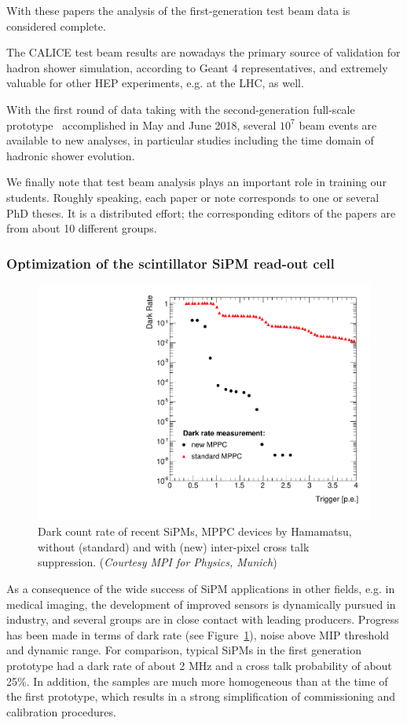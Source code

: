 With these papers the analysis of the first-generation test beam data is considered complete.

The CALICE test beam results are nowadays the primary source of validation for hadron shower simulation, according to Geant 4 representatives, and extremely valuable for other HEP experiments, e.g. at the LHC, as well.

With the first round of data taking with the second-generation full-scale prototype~\cite{Sefkow:2018rhp} accomplished in May and June 2018, several $10^7$ beam events are available to new analyses, in particular studies including the time domain of hadronic shower evolution.

We finally note that test beam analysis plays an important role in training our students. Roughly speaking, each paper or note corresponds to one or several PhD theses. It is a distributed effort; the corresponding editors of the papers are from about 10 different groups.

\subsubsection{Optimization of the scintillator SiPM read-out cell}
\label{sec:OptimizationSiPMRO}

\begin{figure}
	\centering
	\includegraphics[width=.5\linewidth]{Calorimeter/AHCAL/DarkCount}
	\caption{Dark count rate of recent SiPMs, MPPC devices by Hamamatsu, without (standard) and with (new) inter-pixel cross talk suppression. ({\it Courtesy MPI for Physics, Munich})}
	\label{fig:Calorimeter:AHCAL:DarkCount}
\end{figure}

As a consequence of the wide success of SiPM applications in other fields, e.g. in medical imaging, the development of improved sensors is dynamically pursued in industry, and several groups are in close contact with leading producers. Progress has been made in terms of dark rate (see Figure~\ref{fig:Calorimeter:AHCAL:DarkCount}), noise above MIP threshold and dynamic range. For comparison, typical SiPMs in the first generation prototype had a dark rate of about 2 MHz and a cross talk probability of about 25\%. In addition, the samples are much more homogeneous than at the time of the first prototype, which results in a strong simplification of commissioning and calibration procedures.

